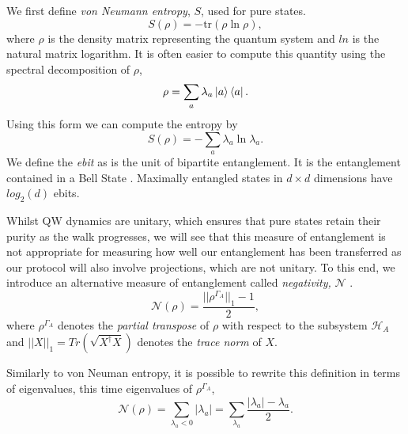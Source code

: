 We first define \emph{von Neumann entropy}, $S$, used for pure states.
\begin{equation}
    S(\rho) = -\text{tr}(\rho \ln \rho),
\end{equation}
where $\rho$ is the density matrix representing the quantum system and $ln$ is the natural matrix logarithm. 
It is often easier to compute this quantity using the spectral decomposition of $\rho$,
\begin{equation}
    \rho = \sum_a \lambda_a \ket{a}\bra{a}.
\end{equation}
Using this form we can compute the entropy by
\begin{equation}
    S(\rho) = -\sum_a \lambda_a \ln\lambda_a.
\end{equation}
We define the \emph{ebit} as is the unit of bipartite entanglement. It is the entanglement contained in a Bell State \cite{Eisert_2000}. Maximally entangled states in $d \times d$ dimensions have $log_2(d)$ ebits.

Whilst QW dynamics are unitary, which ensures that pure states retain their purity as the walk progresses, we will see that this measure of entanglement is not appropriate for measuring how well our entanglement has been transferred as our protocol will also involve projections, which are not unitary.
To this end, we introduce an alternative measure of entanglement called \emph{negativity,} $\mathcal{N}$ \cite{Vidal_2002}.
\begin{equation}
    \mathcal{N}(\rho) = \frac{||\rho^{\Gamma_A}||_1-1}{2},
\end{equation}
where $\rho^{\Gamma_A}$ denotes the \emph{partial transpose} of $\rho$ with respect to the subsystem $\mathcal{H}_A$ and $||X||_1 = Tr(\sqrt{X^\dagger X})$ denotes the \emph{trace norm} of $X$.\newline

Similarly to von Neuman entropy, it is possible to rewrite this definition in terms of eigenvalues, this time eigenvalues of $\rho^{\Gamma_A}$,
\begin{equation}
    \mathcal{N}(\rho) = \sum_{\lambda_a < 0}|\lambda_a| = \sum_{\lambda_a} \frac{|\lambda_a| - \lambda_a}{2}.
\end{equation}